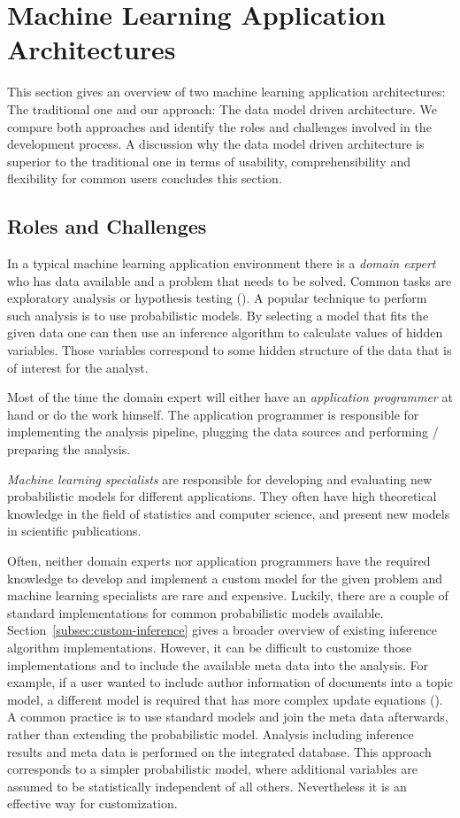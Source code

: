 \section{Machine Learning Application Architectures}

This section gives an overview of two machine learning application architectures: The traditional one and our approach: The data model driven architecture. We compare both approaches and identify the roles and challenges involved in the development process. A discussion why the data model driven architecture is superior to the traditional one in terms of usability, comprehensibility and flexibility for common users concludes this section.

\subsection{Roles and Challenges}

In a typical machine learning application environment there is a \emph{domain expert} who has data available and a problem that needs to be solved. Common tasks are exploratory analysis or hypothesis testing (\cite{tukey1980we}). A popular technique to perform such analysis is to use probabilistic models. By selecting a model that fits the given data one can then use an inference algorithm to calculate values of hidden variables. Those variables correspond to some hidden structure of the data that is of interest for the analyst.

Most of the time the domain expert will either have an \emph{application programmer} at hand or do the work himself. The application programmer is responsible for implementing the analysis pipeline, plugging the data sources and performing / preparing the analysis.

\emph{Machine learning specialists} are responsible for developing and evaluating new probabilistic models for different applications. They often have high theoretical knowledge in the field of statistics and computer science, and present new models in scientific publications.

Often, neither domain experts nor application programmers have the required knowledge to develop and implement a custom model for the given problem and machine learning specialists are rare and expensive. Luckily, there are a couple of standard implementations for common probabilistic models available. Section~\ref{subsec:custom-inference} gives a broader overview of existing inference algorithm implementations. However, it can be difficult to customize those implementations and to include the available meta data into the analysis. For example, if a user wanted to include author information of documents into a topic model, a different model is required that has more complex update equations (\cite{rosen2004author}). A common practice is to use standard models and join the meta data afterwards, rather than extending the probabilistic model. Analysis including inference results and meta data is performed on the integrated database. This approach corresponds to a simpler probabilistic model, where additional variables are assumed to be statistically independent of all others. Nevertheless it is an effective way for customization.

